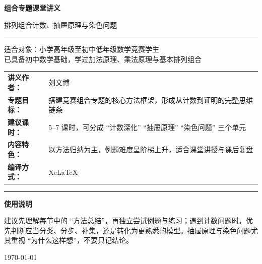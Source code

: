 \documentclass[11pt,a4paper,fontset=fandol]{ctexart}
\theoremstyle{formaltheorem}
\theoremstyle{formalexample}
\begin{document}
\thispagestyle{empty}
\begin{titlepage}
\centering
\vspace*{0.8cm}

\begin{tcolorbox}[
  enhanced,
  width=0.92\textwidth,
  colback=white,
  colframe=mainblue,
  boxrule=1pt,
  arc=0mm,
  left=6mm,
  right=6mm,
  top=8mm,
  bottom=8mm
]
\centering

{\fontsize{24}{30}\selectfont\bfseries 组合专题课堂讲义\par}
\vspace{0.7cm}
{\fontsize{17}{22}\selectfont 排列组合计数、抽屉原理与染色问题\par}

\vspace{1.2cm}
\color{rulegray}\rule{0.72\textwidth}{0.7pt}\par
\vspace{1.1cm}

\begin{tcolorbox}[colback=lightblue,colframe=mainblue,width=0.82\textwidth,boxrule=1pt]
\centering
{\Large 适合对象：小学高年级至初中低年级数学竞赛学生}\\[0.4em]
{\large 已具备初中数学基础，学过加法原理、乘法原理与基本排列组合}
\end{tcolorbox}

\vspace{1.1cm}

\renewcommand{\arraystretch}{1.42}
\begin{tabular}{>{\bfseries}p{3.5cm}p{8cm}}
讲义作者： & 刘文博 \\
专题目标： & 搭建竞赛组合专题的核心方法框架，形成从计数到证明的完整思维链条 \\
建议课时： & 5--7 课时，可分成 ``计数深化'' ``抽屉原理'' ``染色问题'' 三个单元 \\
内容特色： & 以方法归纳为主，例题难度呈阶梯上升，适合课堂讲授与课后复盘 \\
编译方式： & XeLaTeX \\
\end{tabular}

\vspace{1.0cm}
\color{rulegray}\rule{0.72\textwidth}{0.7pt}\par
\vspace{0.7cm}

{\large \bfseries 使用说明\par}
\vspace{0.4cm}
{\normalsize 建议先理解每节中的 ``方法总结''，再独立尝试例题与练习；遇到计数问题时，优先判断应当分类、分步、补集，还是转化为更熟悉的模型。抽屉原理与染色问题尤其重视 ``为什么这样想''，不要只记结论。\par}

{\large \today\par}
\end{tcolorbox}
\end{titlepage}
\end{document}
